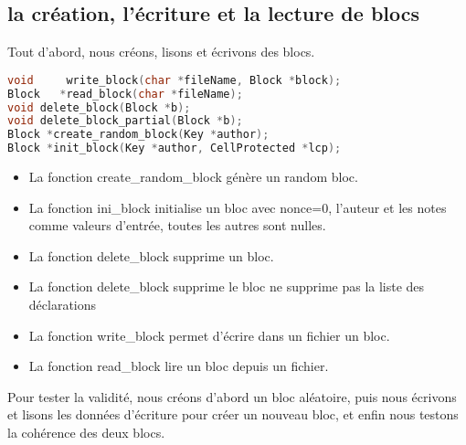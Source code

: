 \documentclass{article}
\begin{document}
\subsection{la création, l'écriture et la lecture de blocs}
Tout d'abord, nous créons, lisons et écrivons des blocs.
\begin{lstlisting}[language={C}]
void     write_block(char *fileName, Block *block);
Block   *read_block(char *fileName);
void delete_block(Block *b);
void delete_block_partial(Block *b);
Block *create_random_block(Key *author);
Block *init_block(Key *author, CellProtected *lcp);
\end{lstlisting}
\begin{itemize}
\item La fonction create\_random\_block génère un random bloc.
\item La fonction ini\_block initialise un bloc avec nonce=0, l'auteur et les notes comme valeurs d'entrée, toutes les autres sont nulles.
\item La fonction delete\_block supprime un bloc.
\item La fonction delete\_block supprime le bloc ne supprime pas la liste des déclarations
\item La fonction write\_block permet d'écrire dans un fichier un bloc.
\item La fonction read\_block lire un bloc depuis un fichier.
\end{itemize}
Pour tester la validité, nous créons d'abord un bloc aléatoire, puis nous écrivons et lisons les données d'écriture pour créer un nouveau bloc, et enfin nous testons la cohérence des deux blocs.
\end{document}
